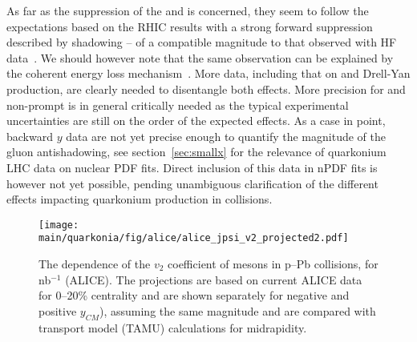 \documentclass[../report.tex]{subfiles}
\providecommand{\main}{..}
\begin{document}
As far as the suppression of the  and \PJgy is concerned, they seem to follow the expectations based on the RHIC results with a strong forward suppression described by shadowing -- of a compatible magnitude to that observed with HF data~\cite{Kusina:2017gkz}. We should however note that the same observation can be explained by the coherent energy loss mechanism~\cite{Arleo:2010rb}. More data, including that on  and Drell-Yan production, are clearly needed to disentangle both effects. More precision for  and non-prompt \PJgy is in general critically needed as the typical experimental uncertainties are still on the order of the expected effects. As a case in point, backward $y$ data are not yet precise enough to quantify the magnitude of the gluon antishadowing, see section~\ref{sec:smallx} for the relevance of quarkonium \pPb LHC data on nuclear PDF fits. Direct inclusion of this data in nPDF fits is however not yet possible, pending unambiguous clarification of the different effects impacting quarkonium production in \pPb collisions.

\begin{figure}[h]
 \begin{center}
  \texttt{[image: \\main/quarkonia/fig/alice/alice\_jpsi\_v2\_projected2.pdf]}
 \end{center}
 \caption{The \pT dependence of the $v_2$ coefficient of \PJgy mesons in p--Pb collisions, for \unit[500]{nb}$^{-1}$ (ALICE). The projections are based on current ALICE data for 0--20\% centrality \cite{Acharya:2017tfn}  and are shown separately for negative and positive $y_{CM}$), assuming the same magnitude and are compared with transport model (TAMU) calculations \cite{Du:2018wsj} for midrapidity.}
\label{FigQ:v2pTpPb}
\end{figure}
\end{document}

